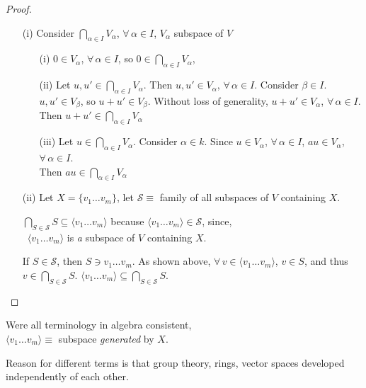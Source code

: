 \documentclass[10pt]{amsart}
\begin{document}
\begin{multicols*}{2}
\begin{proof}
\begin{enumerate}
	\item[(i)] Consider $\bigcap_{\alpha \in I} V_{\alpha}$, $\forall \, \alpha \in I$, $V_{\alpha} $ subspace of $V$
	\begin{enumerate}
		\item[(i)] $0\in V_{\alpha}$, $\forall \, \alpha \in I$, so $0\in \bigcap_{\alpha \in I} V_{\alpha}$,
		\item[(ii)] Let $u,u' \in \bigcap_{\alpha \in I} V_{\alpha}$. Then $u,u' \in V_{\alpha}$, $\forall \, \alpha \in I$. Consider $\beta \in I$. $u, u' \in V_{\beta}$, so $u+u' \in V_{\beta}$.  Without loss of generality, $u + u' \in V_{\alpha}$, $\forall \, \alpha \in I$.  Then $u+u' \in \bigcap_{\alpha \in I} V_{\alpha}$
		\item[(iii)] Let $u\in \bigcap_{\alpha \in I} V_{\alpha}$.  Consider $\alpha \in k$. Since $u\in V_{\alpha}$, $\forall \, \alpha \in I$, $au\in V_{\alpha}$, $\forall \, \alpha \in I$.  \\
		Then $au \in \bigcap_{\alpha \in I} V_{\alpha}$
	\end{enumerate}
\item[(ii)] Let $X = \lbrace v_1 \dots v_m \rbrace$, let $\mathcal{S} \equiv $ family of all subspaces of $V$ containing $X$. 

$\bigcap_{S \in \mathcal{S}} S \subseteq \langle v_1 \dots v_m \rangle$ because $\langle v_1 \dots v_m \rangle \in \mathcal{S}$, since, \\
\qquad \, $\langle v_1 \dots v_m \rangle$ is \emph{a} subspace of $V$ containing $X$. 

If $S\in \mathcal{S}$, then $S\ni v_1 \dots v_m$.  As shown above, $\forall \, v\in \langle v_1 \dots v_m \rangle$, $v\in S$, and thus $v\in \bigcap_{S\in \mathcal{S}} S$. $\langle v_1 \dots v_m \rangle \subseteq \bigcap_{S\in \mathcal{S}} S$.  
\end{enumerate}
	\end{proof}

Were all terminology in algebra consistent, \\
$\langle v_1 \dots v_m \rangle \equiv $ subspace \emph{generated} by $X$.  

Reason for different terms is that group theory, rings, vector spaces developed independently of each other.


\end{multicols*}
\end{document}
